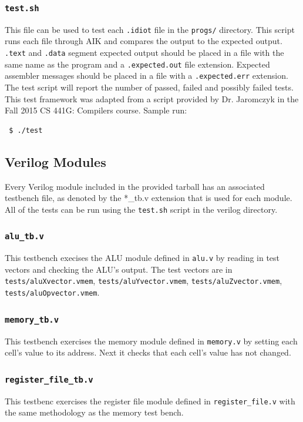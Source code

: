 \documentclass[conference]{IEEEtran}
\begin{document}
\subsubsection{\texttt{test.sh}}
This file can be used to test each \texttt{.idiot} file in the \texttt{progs/}
directory. This script runs each file through AIK and compares the output to
the expected output. \texttt{.text} and \texttt{.data} segment expected
output should be placed in a file with the same name as the program and a 
\texttt{.expected.out} file extension. Expected assembler messages should
be placed in a file with a \texttt{.expected.err} extension. The test script
will report the number of passed, failed and possibly failed tests. This test
framework was adapted from a script provided by Dr. Jaromczyk in the Fall
2015 CS 441G: Compilers course. Sample run:
\begin{verbatim}
 $ ./test
\end{verbatim}

\subsection{Verilog Modules}
Every Verilog module included in the provided tarball has an associated
testbench file, as denoted by the *\_tb.v extension that is used for each
module. All of the tests can be run using the \texttt{test.sh} script in 
the verilog directory. 

\subsubsection{\texttt{alu\_tb.v}}
This testbench execises the ALU module defined in \texttt{alu.v} by reading
in test vectors and checking the ALU's output. The test vectors are in
\texttt{tests/aluXvector.vmem}, \texttt{tests/aluYvector.vmem},
\texttt{tests/aluZvector.vmem}, \texttt{tests/aluOpvector.vmem}. 

\subsubsection{\texttt{memory\_tb.v}}
This testbench exercises the memory module defined in \texttt{memory.v} by
setting each cell's value to its address. Next it checks that each cell's value
has not changed.

\subsubsection{\texttt{register\_file\_tb.v}}
This testbenc exercises the register file module defined in \texttt{register\_file.v} with the same methodology as the memory test bench.
\end{document}
